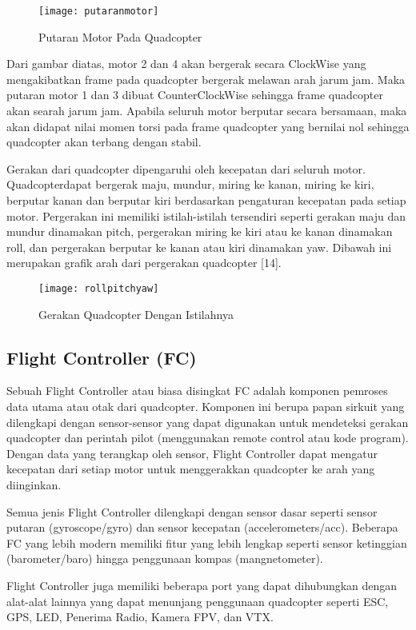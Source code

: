 \begin{figure}[H]
	\centering
	\texttt{[image: putaranmotor]}
	\caption{Putaran Motor Pada Quadcopter}
	\label{fig:motor}
\end{figure}

Dari gambar diatas, motor 2 dan 4 akan bergerak secara ClockWise yang mengakibatkan frame pada quadcopter bergerak melawan arah jarum jam. Maka putaran motor 1 dan 3 dibuat CounterClockWise sehingga frame quadcopter akan searah jarum jam. Apabila seluruh motor berputar secara bersamaan, maka akan didapat nilai momen torsi pada frame quadcopter yang bernilai nol sehingga quadcopter akan terbang dengan stabil.

Gerakan dari quadcopter dipengaruhi oleh kecepatan dari seluruh motor. Quadcopterdapat bergerak maju, mundur, miring ke kanan, miring ke kiri, berputar kanan dan berputar kiri berdasarkan pengaturan kecepatan pada setiap motor. Pergerakan ini memiliki istilah-istilah tersendiri seperti gerakan maju dan mundur dinamakan pitch, pergerakan miring ke kiri atau ke kanan dinamakan roll, dan pergerakan berputar ke kanan atau kiri dinamakan yaw. Dibawah ini merupakan grafik arah dari pergerakan quadcopter [14].

\begin{figure}[H]
	\centering
	\texttt{[image: rollpitchyaw]}
	\caption{Gerakan Quadcopter Dengan Istilahnya}
	\label{fig:gerakqc}
\end{figure}

\subsection{Flight Controller (FC)}
Sebuah Flight Controller atau biasa disingkat FC adalah komponen pemroses data utama atau otak dari quadcopter. Komponen ini berupa papan sirkuit yang dilengkapi dengan sensor-sensor yang dapat digunakan untuk mendeteksi gerakan quadcopter dan perintah pilot (menggunakan remote control atau kode program). Dengan data yang terangkap oleh sensor, Flight Controller dapat mengatur kecepatan dari setiap motor untuk menggerakkan quadcopter ke arah yang diinginkan.

Semua jenis Flight Controller dilengkapi dengan sensor dasar seperti sensor putaran (gyroscope/gyro) dan sensor kecepatan (accelerometers/acc). Beberapa FC yang lebih modern memiliki fitur yang lebih lengkap seperti sensor ketinggian (barometer/baro) hingga penggunaan kompas (mangnetometer).

Flight Controller juga memiliki beberapa port yang dapat dihubungkan dengan alat-alat lainnya yang dapat menunjang penggunaan quadcopter seperti ESC, GPS, LED, Penerima Radio, Kamera FPV, dan VTX.

